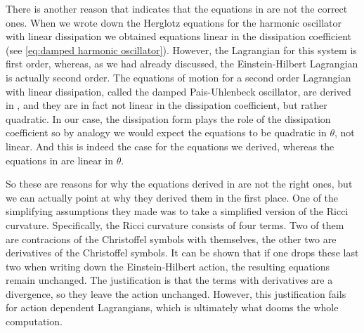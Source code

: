 \documentclass[../main.tex]{subfiles}
\begin{document}
There is another reason that indicates that the equations in \cite{Lazo2017} are not the
correct ones. When we wrote down the Herglotz equations for the harmonic oscillator with
linear dissipation we obtained equations linear in the dissipation coefficient (see
\cref{eq:damped harmonic oscillator}). However, the Lagrangian for this system is first
order, whereas, as we had already discussed, the Einstein-Hilbert Lagrangian is actually
second order. The equations of motion for a second order Lagrangian with linear
dissipation, called the damped Pais-Uhlenbeck oscillator, are derived in \cite{Leon2021a},
and they are in fact not linear in the dissipation coefficient, but rather quadratic. In
our case, the dissipation form plays the role of the dissipation coefficient so by analogy
we would expect the equations to be quadratic in \( \theta \), not linear. And this is
indeed the case for the equations we derived, whereas the equations in \cite{Lazo2017} are
linear in \( \theta \).

So these are reasons for why the equations derived in \cite{Lazo2017} are not the right
ones, but we can actually point at why they derived them in the first place. One of the
simplifying assumptions they made was to take a simplified version of the Ricci curvature.
Specifically, the Ricci curvature consists of four terms. Two of them are contracions of
the Christoffel symbols with themselves, the other two are derivatives of the Christoffel
symbols. It can be shown that if one drops these last two when writing down the
Einstein-Hilbert action, the resulting equations remain unchanged. The justification is
that the terms with derivatives are a divergence, so they leave the action unchanged.
However, this justification fails for action dependent Lagrangians, which is ultimately
what dooms the whole computation. 
\end{document}
